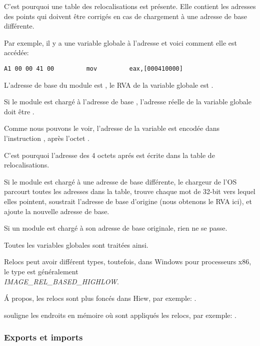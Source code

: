 C'est pourquoi une table des relocalisations est présente.
Elle contient les adresses des points qui doivent être corrigés en cas de chargement
à une adresse de base différente.

Par exemple, il y a une variable globale à l'adresse  et voici comment
elle est accédée:

\begin{lstlisting}
A1 00 00 41 00         mov         eax,[000410000]
\end{lstlisting}

L'adresse de base du module est , le \ac{RVA} de la variable globale est
.

Si le module est chargé à l'adresse de base , l'adresse réelle de la
variable globale doit être .


Comme nous pouvons le voir, l'adresse de la variable est encodée dans l'instruction
, après l'octet .

C'est pourquoi l'adresse des 4 octets aprés  est écrite dans la table de
relocalisations.

Si le module est chargé à une adresse de base différente, le chargeur de l'\ac{OS}
parcourt toutes les adresses dans la table, trouve chaque mot de 32-bit vers lequel
elles pointent, soustrait l'adresse de base d'origine (nous obtenons le \ac{RVA} ici),
et ajoute la nouvelle adresse de base.

Si un module est chargé à son adresse de base originale, rien ne se passe.

Toutes les variables globales sont traitées ainsi.

Relocs peut avoir différent types, toutefois, dans Windows pour processeurs x86, le type est généralement \\
\emph{IMAGE\_REL\_BASED\_HIGHLOW}.


Á propos, les relocs sont plus foncés dans Hiew, par exemple: .

\myindex{\olly}
\olly souligne les endroits en mémoire où sont appliqués les relocs, par exemple:
.

\subsubsection{Exports et imports}

